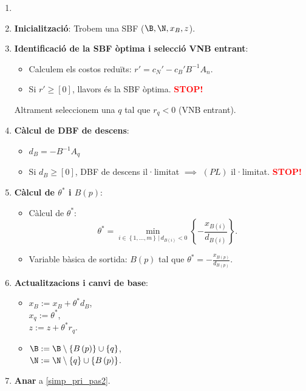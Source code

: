\begin{alg}\label{alg:asp}
    \begin{enumerate}
        \item[]
        \item {\bf Inicialització}: Trobem una SBF ($\B, \N, x_B, z$).
        \item \label{simp_pri_pas2} {\bf Identificació de la SBF òptima i selecció VNB entrant}:
            \begin{itemize}
                \item Calculem els costos reduïts: $r' = c_N' - c_B'B^{-1}A_n$.
                \item Si $r' \geq \left[0\right]$, llavors és la SBF òptima. \textcolor{red}{\bf STOP!}
            \end{itemize}
            Altrament seleccionem una $q$ tal que $r_q < 0$ (VNB entrant).
        \item {\bf Càlcul de DBF de descens}:
            \begin{itemize}
                \item $d_B = -B^{-1}A_q$
                \item Si $d_B \geq \left[0\right]$, DBF de descens il·limitat $\implies$ $\left(PL\right)$ il·limitat. \textcolor{red}{\bf STOP!}
            \end{itemize}
        \item {\bf Càlcul de $\theta^*$ i $B\left(p\right)$}:
            \begin{itemize}
                \item Càlcul de $\theta^*$: 
                    \[\theta^* = \min_{i \in \left\{ 1, \dots, m \right\} \,|\, d_{B\left(i\right)} < 0} \left\{-\frac{x_{B\left(i\right)}}{d_{B\left(i\right)}} \right\}.\]
                \item Variable bàsica de sortida: $B\left(p\right)$ tal que $\theta^* = -\frac{x_{B\left(p\right)}}{d_{B\left(p\right)}}$.
            \end{itemize}
        \item {\bf Actualitzacions i canvi de base}:
            \begin{itemize}
                \item $x_B := x_B + \theta^*d_B$, \\
                    $x_q := \theta^*$, \\
                    $z := z + \theta^* r_q$.
                \item $\B := \B \setminus \left\{B\left(p\right)\right\} \cup \left\{q\right\}$, \\
                    $\N := \N \setminus \left\{q\right\} \cup \left\{B\left(p\right)\right\}$.
            \end{itemize}
        \item {\bf Anar} a \ref{simp_pri_pas2}.
    \end{enumerate}
\end{alg}
